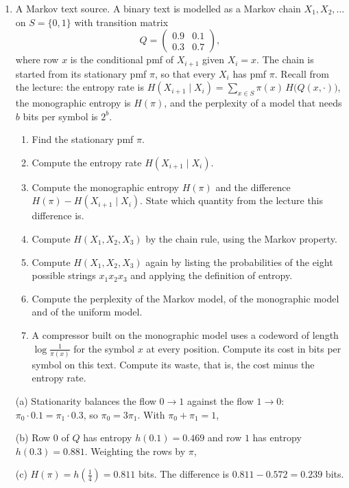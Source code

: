 \begin{enumerate}[resume*=quiz]
\item A Markov text source. A binary text is modelled as a Markov chain $X_1,X_2,\dots$ on $S=\{0,1\}$ with transition matrix
\[
Q=\begin{pmatrix}0.9&0.1\\0.3&0.7\end{pmatrix},
\]
where row $x$ is the conditional pmf of $X_{i+1}$ given $X_i=x$. The chain is started from its stationary pmf $\pi$, so that every $X_i$ has pmf $\pi$. Recall from the lecture: the entropy rate is $H(X_{i+1}\mid X_i)=\sum_{x\in S}\pi(x)\,H\big(Q(x,\cdot)\big)$, the monographic entropy is $H(\pi)$, and the perplexity of a model that needs $b$ bits per symbol is $2^b$.
\begin{enumerate}[label=(\alph*),leftmargin=2em]
\item Find the stationary pmf $\pi$.
\item Compute the entropy rate $H(X_{i+1}\mid X_i)$.
\item Compute the monographic entropy $H(\pi)$ and the difference $H(\pi)-H(X_{i+1}\mid X_i)$. State which quantity from the lecture this difference is.
\item Compute $H(X_1,X_2,X_3)$ by the chain rule, using the Markov property.
\item Compute $H(X_1,X_2,X_3)$ again by listing the probabilities of the eight possible strings $x_1x_2x_3$ and applying the definition of entropy.
\item Compute the perplexity of the Markov model, of the monographic model and of the uniform model.
\item A compressor built on the monographic model uses a codeword of length $\log\frac1{\pi(x)}$ for the symbol $x$ at every position. Compute its cost in bits per symbol on this text. Compute its waste, that is, the cost minus the entropy rate.
\end{enumerate}
\begin{solution}
(a) Stationarity balances the flow $0\to1$ against the flow $1\to0$: $\pi_0\cdot0.1=\pi_1\cdot0.3$, so $\pi_0=3\pi_1$. With $\pi_0+\pi_1=1$,

(b) Row $0$ of $Q$ has entropy $h(0.1)=0.469$ and row $1$ has entropy $h(0.3)=0.881$. Weighting the rows by $\pi$,

(c) $H(\pi)=h(\tfrac14)=0.811$ bits. The difference is $0.811-0.572=0.239$ bits.


\end{solution}
\end{enumerate}

